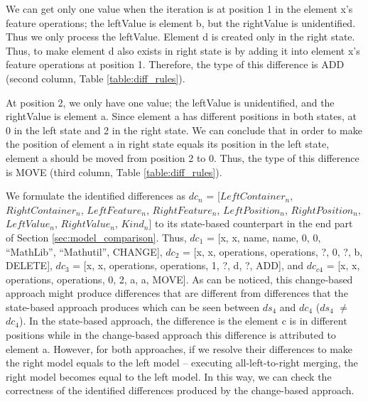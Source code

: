 \documentclass{llncs}
\begin{document}
We can get only one value when the iteration is at position 1 in the element \textsf{x}'s feature \textsf{operations}; the \textsf{leftValue} is element \textsf{b}, but the \textsf{rightValue} is unidentified. Thus we only process the \textsf{leftValue}. Element \textsf{d} is created only in the right state. Thus, to make element \textsf{d} also exists in right state is by adding it into element \textsf{x}'s feature \textsf{operations} at position 1. Therefore, the type of this difference is \textsf{ADD} (second column, Table \ref{table:diff_rules}). 

At position 2, we only have one value; the \textsf{leftValue} is unidentified, and the \textsf{rightValue} is element \textsf{a}. Since element \textsf{a} has different positions in both states, at 0 in the left state and 2 in the right state. We can conclude that in order to make the position of element \textsf{a} in right state equals its position in the left state, element \textsf{a} should be moved from position 2 to 0. Thus, the type of this difference is \textsf{MOVE} (third column, Table \ref{table:diff_rules}).

We formulate the identified differences as $dc_{n}$ = [$LeftContainer_n$, $RightContainer_n$, $LeftFeature_n$, $RightFeature_n$, $LeftPosition_n$, $RightPosition_n$, $LeftValue_n$, $RightValue_n$, $Kind_n$] to its state-based counterpart in the end part of Section \ref{sec:model_comparison}. Thus, $dc_{1}$ =  [\textsf{x}, \textsf{x}, \textsf{name}, \textsf{name}, 0, 0, ``MathLib'', ``Mathutil'', \textsf{CHANGE}], $dc_{2}$ = [\textsf{x}, \textsf{x}, \textsf{operations}, \textsf{operations}, ?, 0, ?, \textsf{b}, \textsf{DELETE}], $dc_{3}$ = [\textsf{x}, \textsf{x}, \textsf{operations}, \textsf{operations}, 1, ?, \textsf{d}, ?, \textsf{ADD}], and $dc_{c4}$ = [\textsf{x}, \textsf{x}, \textsf{operations}, \textsf{operations}, 0, 2, \textsf{a}, \textsf{a}, \textsf{MOVE}]. As can be noticed, this change-based approach might produce differences that are different from differences that the state-based approach produces which can be seen between  $ds_{4}$ and $dc_{4}$ ($ds_{4}$ $\neq$ $dc_{4}$). In the state-based approach, the difference is the element \textsf{c} is in different positions while in the change-based approach this difference is attributed to element \textsf{a}. However, for both approaches, if we resolve their differences to make the right model equals to the left model -- executing all-left-to-right merging, the right model becomes equal to the left model. In this way, we can check the correctness of the identified differences produced by the change-based approach.
\end{document}
